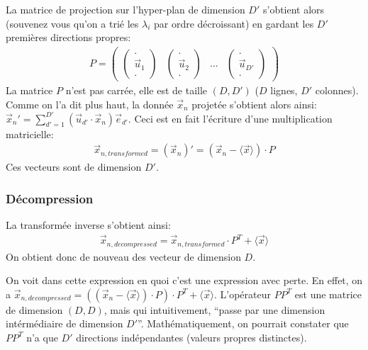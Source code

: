 \documentclass[french,twoside]{article}
\begin{document}
La matrice de projection sur l'hyper-plan de dimension $D'$ s'obtient alors (souvenez vous qu'on a trié les $\lambda_i$ par ordre décroissant) en gardant les $D'$ premières directions propres:
\begin{align}
P = \begin{pmatrix}  \begin{pmatrix} . \\  \vec u_1 \\  .  \end{pmatrix} &  \begin{pmatrix} . \\  \vec  u_2 \\  .  \end{pmatrix} & ... &  \begin{pmatrix} . \\ \vec u_{D'} \\  .  \end{pmatrix} \end{pmatrix}
\end{align}
La matrice $P$ n'est pas carrée, elle est de taille $(D,D')$ ($D$ lignes, $D'$ colonnes).
Comme on l'a dit plus haut, la donnée $\vec x_n$ projetée s'obtient alors ainsi:
$\vec x_n' = \sum_{d'=1}^{D'} (\vec u_{d'} \cdot \vec x_n ) \vec e_{d'}$.
Ceci est en fait l'écriture d'une multiplication matricielle:
\begin{align}
\vec{x}_{n, transformed} = (\vec{x}_n)' = (\vec{x}_n -\langle \vec{x}\rangle) \cdot P  \end{align}
Ces vecteurs sont de dimension $D'$.

\subsubsection{Décompression}

La transformée inverse s'obtient ainsi:
\begin{align}
\vec{x}_{n,decompressed} =\vec{x}_{n, transformed} \cdot  P^T + \langle \vec{x}\rangle
\end{align}
On obtient donc de nouveau des vecteur de dimension $D$.

On voit dans cette expression en quoi c'est une expression avec perte. En effet, on a 
$\vec{x}_{n,decompressed} =((\vec{x}_n -\langle \vec{x}\rangle) \cdot P ) \cdot  P^T + \langle \vec{x}\rangle$.
L'opérateur $PP^T$ est une matrice de dimension $(D,D)$, mais qui intuitivement, ``passe par une dimension intérmédiaire de dimension $D'$''. Mathématiquement, on pourrait constater que $PP^T$ n'a que $D'$ directions indépendantes (valeurs propres distinctes).
\end{document}
